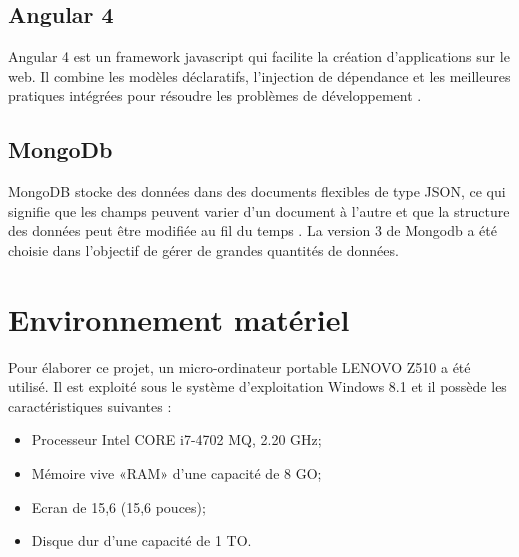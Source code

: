 \subsection{Angular 4}
Angular 4 est un framework javascript qui facilite la création d'applications sur le web. Il combine les modèles déclaratifs, l'injection de dépendance et les meilleures pratiques intégrées pour résoudre les problèmes de développement \cite{Angular}.


\subsection{MongoDb}
MongoDB stocke des données dans des documents flexibles de type JSON, ce qui signifie que les champs peuvent varier d'un document à l'autre et que la structure des données peut être modifiée au fil du temps \cite{MongoDb}. La version 3 de Mongodb a été choisie dans l'objectif de gérer de grandes quantités de données.

\section{Environnement matériel}
Pour élaborer ce projet, un micro-ordinateur portable LENOVO Z510 a été utilisé. Il est exploité sous le système d’exploitation Windows 8.1 et il possède les caractéristiques suivantes :
\begin{itemize}

    \item Processeur Intel CORE i7-4702 MQ, 2.20 GHz;
    
   \item  Mémoire vive «RAM» d’une capacité de 8 GO;

   \item  Ecran de 15,6 (15,6 pouces);

 \item	  Disque dur d’une capacité de 1 TO.
\end{itemize}
\newpage
